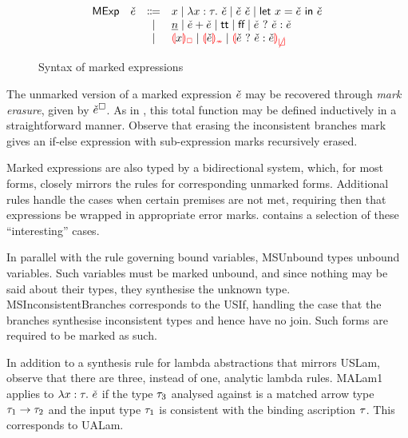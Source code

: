
\begin{figure}[htbp]
  \[\begin{array}{rrcl}
    \ECMName & \ECMV & \Coloneqq & x \mid \ECLam{x}{\TMV}{\ECMV} \mid \ECAp{\ECMV}{\ECMV} \mid \ECLet{x}{\ECMV}{\ECMV} \\
             &       & \mid         & \ECNumMV \mid \ECPlus{\ECMV}{\ECMV}
                       \mid           \ECTrue \mid \ECFalse \mid \ECIf{\ECMV}{\ECMV}{\ECMV} \\
             &       & \mid         & \ECUnbound{x} \mid \ECInconType{\ECMV} \mid \ECInconBr{\ECMV}{\ECMV}{\ECMV}
  \end{array}\]
  \caption{Syntax of marked expressions}
  \label{fig:calculus-syntax-mexp}
\end{figure}

The unmarked version of a marked expression $\check{e}$ may be recovered through \emph{mark erasure},
given by $\check{e}^{\square}$. As in , this total function may be defined
inductively in a straightforward manner. Observe that erasing the inconsistent branches mark gives
an if-else expression with sub-expression marks recursively erased.



Marked expressions are also typed by a bidirectional system, which, for most forms, closely mirrors
the rules for corresponding unmarked forms. Additional rules handle the cases when certain premises
are not met, requiring then that expressions be wrapped in appropriate error marks.
 contains a selection of these ``interesting'' cases.

In parallel with the rule governing bound variables, MSUnbound types unbound variables. Such
variables must be marked unbound, and since nothing may be said about their types, they synthesise
the unknown type. MSInconsistentBranches corresponds to the USIf, handling the case that the
branches synthesise inconsistent types and hence have no join. Such forms are required to be marked
as such.




In addition to a synthesis rule for lambda abstractions that mirrors USLam, observe that there are
three, instead of one, analytic lambda rules. MALam1 applies to $\lambda x : \tau. ~\check{e}$ if the type
$\tau_3$ analysed against is a matched arrow type $\tau_1 \to \tau_2$ and the input type
$\tau_1$ is consistent with the binding ascription $\tau$. This corresponds to UALam.

